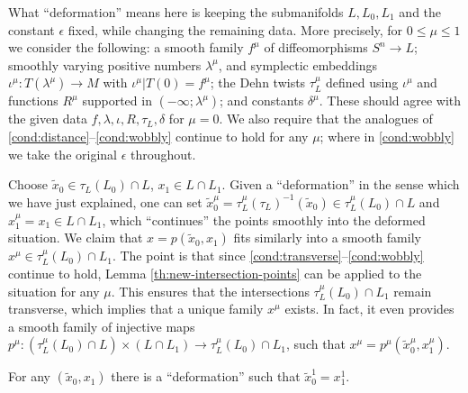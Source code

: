 \documentclass[10pt,letterpaper]{article}
\begin{document}
What ``deformation'' means here is keeping the submanifolds $L,L_0,L_1$ and the
constant $\epsilon$ fixed, while changing the remaining data. More precisely,
for $0 \leq \mu \leq 1$ we consider the following: a smooth family $f^\mu$ of
diffeomorphisms $S^n \rightarrow L$; smoothly varying positive numbers
$\lambda^\mu$, and symplectic embeddings $\iota^\mu: T(\lambda^\mu) \rightarrow
M$ with $\iota^\mu|T(0) = f^\mu$; the Dehn twists $\tau_L^\mu$ defined using
$\iota^\mu$ and functions $R^\mu$ supported in $(-\infty;\lambda^\mu)$; and
constants $\delta^\mu$. These should agree with the given data
$f,\lambda,\iota,R,\tau_L,\delta$ for $\mu = 0$. We also require that the
analogues of \ref{cond:distance}--\ref{cond:wobbly} continue to hold for any
$\mu$; where in \ref{cond:wobbly} we take the original $\epsilon$ throughout.

Choose $\tilde{x}_0 \in \tau_L(L_0) \cap L$, $x_1 \in L \cap L_1$. Given a
``deformation'' in the sense which we have just explained, one can set
$\tilde{x}_0^\mu = \tau_L^\mu(\tau_L)^{-1}(\tilde{x}_0) \in \tau_L^\mu(L_0)
\cap L$ and $x_1^\mu = x_1 \in L \cap L_1$, which ``continues'' the points
smoothly into the deformed situation. We claim that $x = p(\tilde{x}_0,x_1)$
fits similarly into a smooth family $x^\mu \in \tau_L^\mu(L_0) \cap L_1$. The
point is that since \ref{cond:transverse}--\ref{cond:wobbly} continue to hold,
Lemma \ref{th:new-intersection-points} can be applied to the situation for any
$\mu$. This ensures that the intersections $\tau_L^\mu(L_0) \cap L_1$ remain
transverse, which implies that a unique family $x^\mu$ exists. In fact, it even
provides a smooth family of injective maps $p^\mu: (\tau_L^\mu(L_0) \cap L)
\times (L \cap L_1) \rightarrow \tau_L^\mu(L_0) \cap L_1$, such that $x^\mu =
p^\mu(\tilde{x}_0^\mu,x_1^\mu)$.

\begin{lemma} \label{th:antipodes}
For any $(\tilde{x}_0,x_1)$ there is a ``deformation'' such that $\tilde{x}_0^1
= x_1^1$.
\end{lemma}
\end{document}
